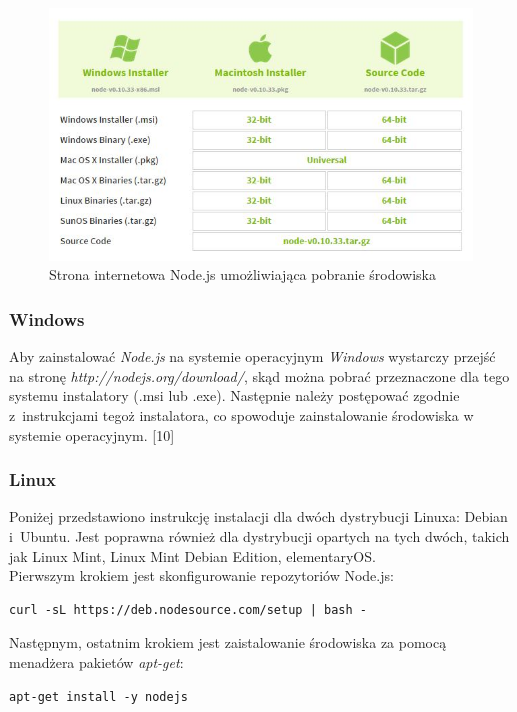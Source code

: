 \documentclass[12pt,a4paper,notitlepage]{article}
\begin{document}
\begin{figure}[H]
    \centering
    \includegraphics[width=\linewidth]{obrazy/node}
    \caption{Strona internetowa Node.js umożliwiająca pobranie środowiska}
\end{figure} 

\subsubsection{Windows}
Aby zainstalować \textit{Node.js} na systemie operacyjnym \textit{Windows} wystarczy przejść na stronę \textit{http://nodejs.org/download/}, skąd można pobrać przeznaczone dla tego systemu instalatory (.msi lub .exe). Następnie należy postępować zgodnie z~instrukcjami tegoż instalatora, co spowoduje zainstalowanie środowiska w systemie operacyjnym. [10]

\subsubsection{Linux}
Poniżej przedstawiono instrukcję instalacji dla dwóch dystrybucji Linuxa: Debian i~Ubuntu. Jest poprawna również dla dystrybucji opartych na tych dwóch, takich jak Linux Mint, Linux Mint Debian Edition, elementaryOS. \\
Pierwszym krokiem jest skonfigurowanie repozytoriów Node.js:
\begin{lstlisting}
curl -sL https://deb.nodesource.com/setup | bash -
\end{lstlisting}

Następnym, ostatnim krokiem jest zaistalowanie środowiska za pomocą menadżera pakietów \textit{apt-get}:
\begin{lstlisting}
apt-get install -y nodejs
\end{lstlisting}
\end{document}
